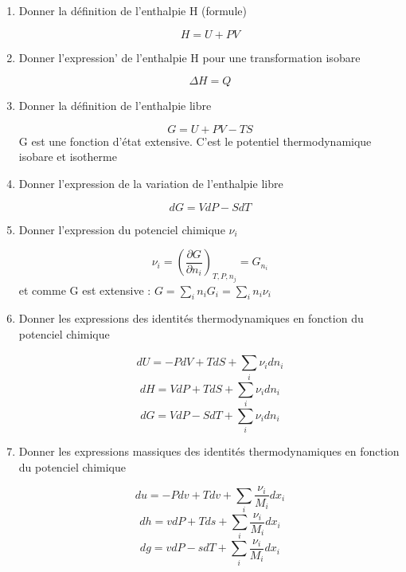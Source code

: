 \begin{enumerate}[label=\arabic{enumi} - , left=0pt, itemsep=1em]
    \item Donner la définition de l'enthalpie H (formule)\par
    \begin{solution}
        \[ H= U + PV\]
    \end{solution}

    \item Donner l'expression' de l'enthalpie H pour une transformation isobare\par
    \begin{solution}
        \[  \Delta H = Q\]
    \end{solution}

    \item Donner la définition de l'enthalpie libre\par
    \begin{solution}
        \[ G = U + PV - TS\]
        G est une fonction d'état extensive. C'est le potentiel thermodynamique isobare et isotherme
    \end{solution}

    \item Donner l'expression de la variation de l'enthalpie libre\par
    \begin{solution}
       \[ dG = VdP - SdT \]
    \end{solution}

    \item Donner l'expression du potenciel chimique $\nu_i$\par
    \begin{solution}
       \[ \nu_i = (\frac{\partial G}{\partial n_i})_{T,P,n_j} = G_{n_i}\] 
       et comme G est extensive : $ G = \sum_{i}^{} n_i G_i = \sum_{i}^{} n_i \nu_i$ 
    \end{solution}

    \item Donner les expressions des identités thermodynamiques en fonction du potenciel chimique\par
    \begin{solution}
        \[ dU = -PdV + TdS + \sum_{i}^{} \nu_i dn_i\]
        \[ dH = VdP + TdS + \sum_{i}^{} \nu_i dn_i\]
        \[ dG = VdP - SdT + \sum_{i}^{} \nu_i dn_i\]
    \end{solution}

    \item Donner les expressions massiques des identités thermodynamiques en fonction du potenciel chimique\par
    \begin{solution}
        \[ du = -Pdv + Tdv + \sum_{i}^{} \frac{\nu_i}{M_i} dx_i\]
        \[ dh = vdP + Tds + \sum_{i}^{} \frac{\nu_i}{M_i} dx_i\]
        \[ dg = vdP - sdT + \sum_{i}^{} \frac{\nu_i}{M_i} dx_i\]
    \end{solution}


\end{enumerate}
